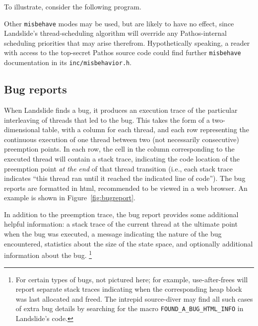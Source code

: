 To illustrate, consider the following program.


Other {\tt misbehave} modes may be used, but are likely to have no effect,
since Landslide's thread-scheduling algorithm will override
any Pathos-internal scheduling priorities that may arise therefrom.
Hypothetically speaking, a reader with access to the top-secret Pathos source code
could find further {\tt misbehave} documentation in its {\tt inc/misbehavior.h}.


\subsection{Bug reports}
\label{sec:landslide-bugreport}

When Landslide finds a bug, it produces an execution trace of the particular interleaving of threads that led to the bug.
This takes the form of a two-dimensional table,
with a column for each thread,
and each row representing the continuous execution of one thread between two (not necessarily consecutive) preemption points.
In each row, the cell in the column corresponding to the executed thread will contain a stack trace,
indicating the code location of the preemption point {\em at the end} of that thread transition
(i.e., each stack trace indicates ``this thread ran until it reached the indicated line of code'').
The bug reports are formatted in html, recommended to be viewed in a web browser.
An example is shown in Figure~\ref{fig:bugreport}.

In addition to the preemption trace, the bug report provides some additional helpful information:
a stack trace of the current thread at the ultimate point when the bug was executed,
a message indicating the nature of the bug encountered,
statistics about the size of the state space,
and optionally additional information about the bug.%
\footnote{For certain types of bugs, not pictured here;
for example, use-after-frees will report separate stack traces
indicating when the corresponding heap block was last allocated and freed.
The intrepid source-diver may find all such cases of extra bug details
by searching for the macro {\tt FOUND\_A\_BUG\_HTML\_INFO} in Landslide's code.}

